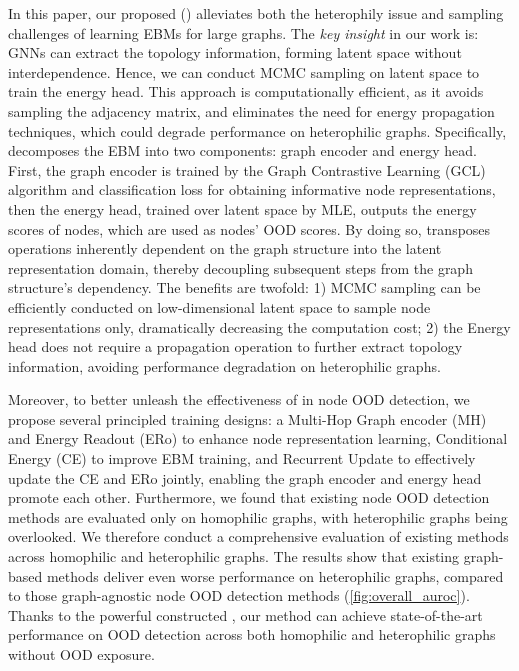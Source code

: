 In this paper, our proposed \bname (\shortname) alleviates both the heterophily issue and sampling challenges of learning EBMs for large graphs. 
The \textit{key insight} in our work is: GNNs can extract the topology information, forming latent space without interdependence. Hence, we can conduct MCMC sampling on latent space to train the energy head. 
This approach is computationally efficient, as it avoids sampling the adjacency matrix, and eliminates the need for energy propagation techniques, which could degrade performance on heterophilic graphs.
Specifically, \shortname decomposes the EBM into two components: graph encoder and energy head. 
First, the graph encoder is trained by the Graph Contrastive Learning (GCL) algorithm and classification loss for obtaining informative node representations, then the energy head, trained over latent space by MLE, outputs the energy scores of nodes, which are used as nodes' OOD scores. 
By doing so, \shortname transposes operations inherently dependent on the graph structure into the latent representation domain, thereby decoupling subsequent steps from the graph structure's dependency. 
The benefits are twofold: 
1) MCMC sampling can be efficiently conducted on low-dimensional latent space to sample node representations only, dramatically decreasing the computation cost; 
2) the Energy head does not require a propagation operation to further extract topology information, avoiding performance degradation on heterophilic graphs.


Moreover, to better unleash the effectiveness of \shortname in node OOD detection, we propose several principled training designs: a Multi-Hop Graph encoder (MH) and Energy Readout (ERo) to enhance node representation learning, Conditional Energy (CE) to improve EBM training, and Recurrent Update to effectively update the CE and ERo jointly, enabling the graph encoder and energy head promote each other. 
Furthermore, we found that existing node OOD detection methods are evaluated only on homophilic graphs, with heterophilic graphs being overlooked. We therefore conduct a comprehensive evaluation of existing methods across homophilic and heterophilic graphs. The results show that existing graph-based methods deliver even worse performance on heterophilic graphs, compared to those graph-agnostic node OOD detection methods (\cref{fig:overall_auroc}). 
Thanks to the powerful constructed \shortname, our method can achieve state-of-the-art performance on OOD detection across both homophilic and heterophilic graphs without OOD exposure. 

